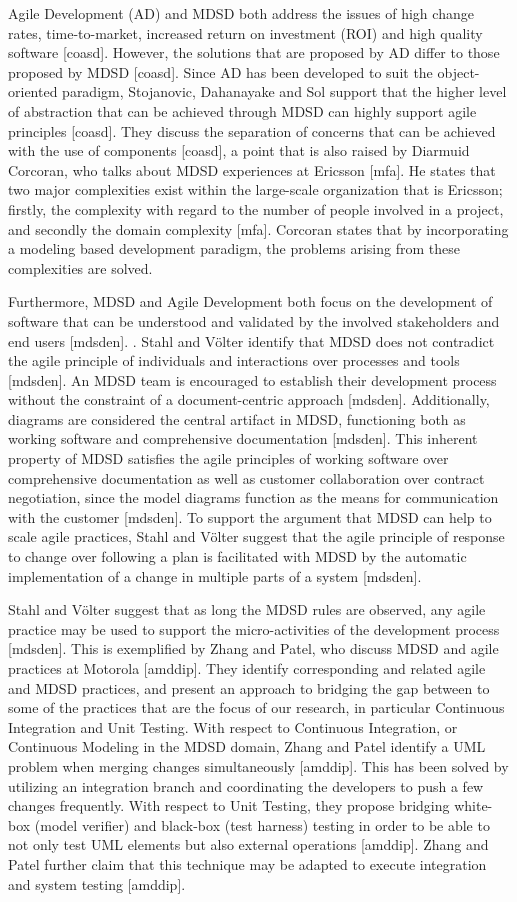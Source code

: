 \documentclass[fina_report_innit.tex]{subfiles}
\begin{document}
Agile Development (AD) and MDSD both address the issues of high change rates, time-to-market, increased return on investment (ROI) and high quality software [coasd]. However, the solutions that are proposed by AD differ to those proposed by MDSD [coasd]. Since AD has been developed to suit the object-oriented paradigm, Stojanovic, Dahanayake and Sol support that the higher level of abstraction that can be achieved through MDSD can highly support agile principles [coasd]. They discuss the separation of concerns that can be achieved with the use of components [coasd], a point that is also raised by Diarmuid Corcoran, who talks about MDSD experiences at Ericsson [mfa]. He states that two major complexities exist within the large-scale organization that is Ericsson; firstly, the complexity with regard to the number of people involved in a project, and secondly the domain complexity [mfa]. Corcoran states that by incorporating a modeling based development paradigm, the problems arising from these complexities are solved. 

Furthermore, MDSD and Agile Development both focus on the development of software that can be understood and validated by the involved stakeholders and end users [mdsden]. . Stahl and Völter identify that MDSD does not contradict the agile principle of individuals and interactions over processes and tools [mdsden]. An MDSD team is encouraged to establish their development process without the constraint of a document-centric approach [mdsden]. Additionally, diagrams are considered the central artifact in MDSD, functioning both as working software and comprehensive documentation [mdsden]. This inherent property of MDSD satisfies the agile principles of working software over comprehensive documentation as well as customer collaboration over contract negotiation, since the model diagrams function as the means for communication with the customer [mdsden]. To support the argument that MDSD can help to scale agile practices, Stahl and Völter suggest that the agile principle of response to change over following a plan is facilitated with MDSD by the automatic implementation of a change in multiple parts of a system [mdsden].

Stahl and Völter suggest that as long the MDSD rules are observed, any agile practice may be used to support the micro-activities of the development process [mdsden]. This is exemplified by Zhang and Patel, who discuss MDSD and agile practices at Motorola [amddip]. They identify corresponding and related agile and MDSD practices, and present an approach to bridging the gap between to some of the practices that are the focus of our research, in particular Continuous Integration and Unit Testing. With respect to Continuous Integration, or Continuous Modeling in the MDSD domain, Zhang and Patel identify a UML problem when merging changes simultaneously [amddip]. This has been solved by utilizing an integration branch and coordinating the developers to push a few changes frequently. With respect to Unit Testing, they propose bridging white-box (model verifier) and black-box (test harness) testing in order to be able to not only test UML elements but also external operations [amddip]. Zhang and Patel further claim that this technique may be adapted to execute integration and system testing [amddip].
\end{document}
